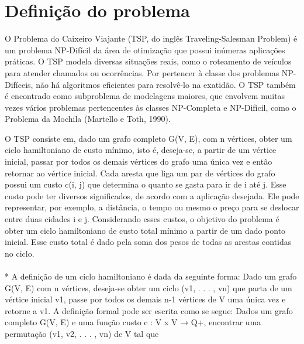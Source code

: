 \documentclass[
	article,			%
	12pt,				%
	oneside,			%
	a4paper,			%
	english,			%
	brazil,				%
	sumario=tradicional
	]{abntex2}
\begin{document}
\section{Definição do problema}

O Problema do Caixeiro Viajante (TSP, do inglês Traveling-Salesman Problem) é um problema
NP-Difícil da área de otimização que possui inúmeras aplicações práticas. O TSP modela diversas
situações reais, como o roteamento de veículos para atender chamados ou ocorrências.
Por pertencer à classe dos problemas NP-Difíceis, não há algoritmos eficientes para resolvê-lo
na exatidão. O TSP também é encontrado como subproblema de modelagens maiores, que envolvem
muitas vezes vários problemas pertencentes às classes NP-Completa e NP-Difícil, como
o Problema da Mochila (Martello e Toth, 1990). 

O TSP consiste em, dado um grafo completo G(V, E), com n vértices, obter um ciclo
hamiltoniano de custo mínimo, isto é, deseja-se, a partir de um vértice inicial, passar por todos
os demais vértices do grafo uma única vez e então retornar ao vértice inicial. Cada aresta que
liga um par de vértices do grafo possui um custo c(i, j) que determina o quanto se gasta para ir de i até j. Esse custo pode ter diversos significados, de acordo com a aplicação desejada.
Ele pode representar, por exemplo, a distância, o tempo ou mesmo o preço para se deslocar
entre duas cidades i e j. Considerando esses custos, o objetivo do problema é obter um ciclo
hamiltoniano de custo total mínimo a partir de um dado ponto inicial. Esse custo total é dado
pela soma dos pesos de todas as arestas contidas no ciclo. \\
\\*
A definição de um ciclo hamiltoniano é dada da seguinte forma:
Dado um grafo G(V, E) com n vértices, deseja-se obter um ciclo (v1, . . . , vn) que parta de
um vértice inicial v1, passe por todos os demais n-1 vértices de V uma única vez e retorne a v1.
A definição formal pode ser escrita como se segue:
Dados um grafo completo G(V, E) e uma função custo c : V x V → Q+, encontrar uma
permutação (v1, v2, . . . , vn) de V tal que
\\
\tabcc
\end{document}
